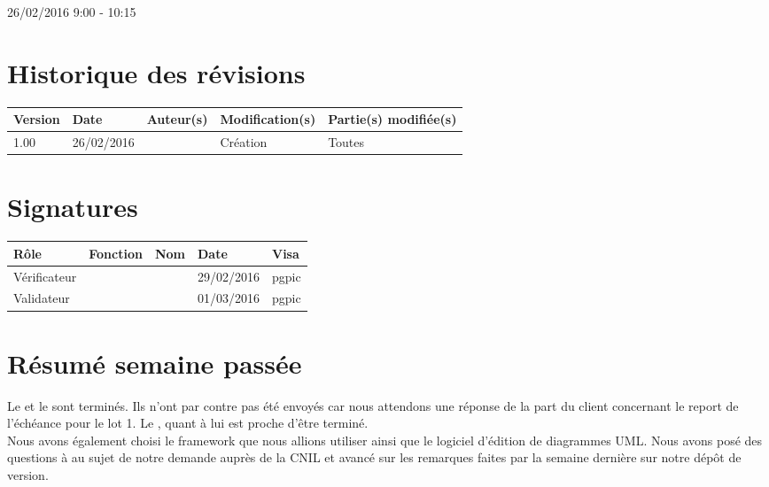 \documentclass [a4paper] {article}
\begin{document}
26/02/2016			 				%
\hfill   
\hfill 	 9:00 - 10:15 				%


\section*{Historique des révisions}
\begin{center}
			\begin{tabular}{| p{2.5cm} | p{3cm} | p{3cm} | p{3cm} | p{3.5cm} |}
				\hline
				\rowcolor{Gray}
				Version & Date & Auteur(s) & Modification(s) & Partie(s) modifiée(s)		 \\
				\hline
				1.00 & 26/02/2016 & \Pierre & Création & Toutes \\
		\hline		
			\end{tabular}
		\end{center}

\section*{Signatures}

		\begin{center}
			\begin{tabular}{| p{2.5cm} | p{4cm} | p{3cm} | p{3cm} | p{2.5cm} |}
				\hline
				\rowcolor{Gray}
				Rôle & Fonction & Nom & Date & Visa		 \\
				\hline
				Vérificateur & \RGC & \Mathieu & 29/02/2016 & pgpic \\[30pt]
				\hline
				Validateur & \CP & \Sergi & 01/03/2016 & pgpic \\[30pt]	
				\hline
			\end{tabular}
		\end{center}


\section{Résumé semaine passée}
Le \DSE{} et le \PTV{} sont terminés. Ils n'ont par contre pas été envoyés car nous attendons une réponse de la part du client concernant le report de l'échéance pour le lot 1. Le \DSI{}, quant à lui est proche d'être terminé.
\\
Nous avons également choisi le framework que nous allions utiliser ainsi que le logiciel d'édition de diagrammes UML. Nous avons posé des questions à \nomTuteurQualite{} au sujet de notre demande auprès de la CNIL et avancé sur les remarques faites par \nomTuteurPedago{} la semaine dernière sur notre dépôt de version.
\end{document}
